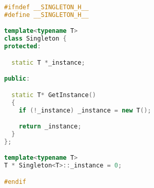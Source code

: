 \begin{lstlisting}[caption=singleton.h,language=C++]
#ifndef __SINGLETON_H__
#define __SINGLETON_H__

template<typename T>
class Singleton {
protected:

  static T *_instance;

public:

  static T* GetInstance()
  {
    if (!_instance) _instance = new T();

    return _instance;
  }
};

template<typename T>
T * Singleton<T>::_instance = 0;

#endif
\end{lstlisting}






\begin{lstlisting}[caption=.cpp,language=C++]
\end{lstlisting}



